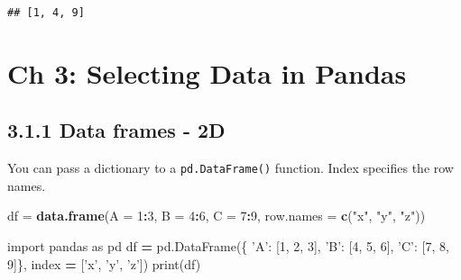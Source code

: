 \documentclass[]{book}
\newenvironment{Shaded}{\begin{snugshade}}{\end{snugshade}}
\newcommand{\BuiltInTok}[1]{#1}
\newcommand{\DataTypeTok}[1]{\textcolor[rgb]{0.13,0.29,0.53}{#1}}
\newcommand{\DecValTok}[1]{\textcolor[rgb]{0.00,0.00,0.81}{#1}}
\newcommand{\ImportTok}[1]{#1}
\newcommand{\KeywordTok}[1]{\textcolor[rgb]{0.13,0.29,0.53}{\textbf{#1}}}
\newcommand{\NormalTok}[1]{#1}
\newcommand{\OperatorTok}[1]{\textcolor[rgb]{0.81,0.36,0.00}{\textbf{#1}}}
\newcommand{\StringTok}[1]{\textcolor[rgb]{0.31,0.60,0.02}{#1}}
\theoremstyle{definition}
\theoremstyle{definition}
\theoremstyle{definition}
\theoremstyle{remark}
\begin{document}
\begin{verbatim}
## [1, 4, 9]
\end{verbatim}

\hypertarget{ch-3-selecting-data-in-pandas}{%
\chapter{Ch 3: Selecting Data in
Pandas}\label{ch-3-selecting-data-in-pandas}}

\hypertarget{data-frames---2d}{%
\section{3.1.1 Data frames - 2D}\label{data-frames---2d}}

You can pass a dictionary to a \texttt{pd.DataFrame()} function. Index
specifies the row names.

\begin{Shaded}
\begin{Highlighting}[]
\NormalTok{df =}\StringTok{ }\KeywordTok{data.frame}\NormalTok{(}\DataTypeTok{A =} \DecValTok{1}\OperatorTok{:}\DecValTok{3}\NormalTok{,}
                \DataTypeTok{B =} \DecValTok{4}\OperatorTok{:}\DecValTok{6}\NormalTok{,}
                \DataTypeTok{C =} \DecValTok{7}\OperatorTok{:}\DecValTok{9}\NormalTok{,}
                \DataTypeTok{row.names =} \KeywordTok{c}\NormalTok{(}\StringTok{"x"}\NormalTok{, }\StringTok{"y"}\NormalTok{, }\StringTok{"z"}\NormalTok{))}
\end{Highlighting}
\end{Shaded}

\begin{Shaded}
\begin{Highlighting}[]
\ImportTok{import}\NormalTok{ pandas }\ImportTok{as}\NormalTok{ pd}
\NormalTok{df }\OperatorTok{=}\NormalTok{ pd.DataFrame(\{}
            \StringTok{'A'}\NormalTok{: [}\DecValTok{1}\NormalTok{, }\DecValTok{2}\NormalTok{, }\DecValTok{3}\NormalTok{],}
            \StringTok{'B'}\NormalTok{: [}\DecValTok{4}\NormalTok{, }\DecValTok{5}\NormalTok{, }\DecValTok{6}\NormalTok{], }
            \StringTok{'C'}\NormalTok{: [}\DecValTok{7}\NormalTok{, }\DecValTok{8}\NormalTok{, }\DecValTok{9}\NormalTok{]\}, }
\NormalTok{            index }\OperatorTok{=}\NormalTok{ [}\StringTok{'x'}\NormalTok{, }\StringTok{'y'}\NormalTok{, }\StringTok{'z'}\NormalTok{])}
\BuiltInTok{print}\NormalTok{(df)}
\end{Highlighting}
\end{Shaded}
\end{document}
